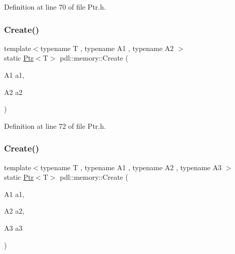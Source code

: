 Definition at line 70 of file Ptr.\+h.


\begin{DoxyCode}{0}

\end{DoxyCode}
\mbox{\label{namespacepdl_1_1memory_a4be609cc27b59d4ef61267cd3f0f86a0}} 
\subsubsection{\texorpdfstring{Create()}{Create()}\hspace{0.1cm}{\footnotesize\ttfamily [3/8]}}
{\footnotesize\ttfamily template$<$typename T , typename A1 , typename A2 $>$ \\
static \mbox{\hyperlink{classpdl_1_1memory_1_1_ptr}{Ptr}}$<$T$>$ pdl\+::memory\+::\+Create (\begin{DoxyParamCaption}\item[{A1}]{a1,  }\item[{A2}]{a2 }\end{DoxyParamCaption})\hspace{0.3cm}{\ttfamily [static]}}



Definition at line 72 of file Ptr.\+h.


\begin{DoxyCode}{0}

\end{DoxyCode}
\mbox{\label{namespacepdl_1_1memory_ab8f955922bd749f68a4e231872267d04}} 
\subsubsection{\texorpdfstring{Create()}{Create()}\hspace{0.1cm}{\footnotesize\ttfamily [4/8]}}
{\footnotesize\ttfamily template$<$typename T , typename A1 , typename A2 , typename A3 $>$ \\
static \mbox{\hyperlink{classpdl_1_1memory_1_1_ptr}{Ptr}}$<$T$>$ pdl\+::memory\+::\+Create (\begin{DoxyParamCaption}\item[{A1}]{a1,  }\item[{A2}]{a2,  }\item[{A3}]{a3 }\end{DoxyParamCaption})\hspace{0.3cm}{\ttfamily [static]}}



